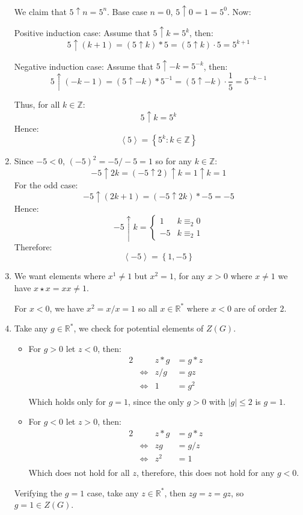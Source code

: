 \documentclass[a4paper, 11pt]{article}
\newcommand{\ZZ}{\mathbb{Z}}
\newcommand{\RR}{\mathbb{R}}
\def\set#1{\left\{ #1 \right\}}
\def\gen#1{\left\langle#1 \right\rangle}
\begin{document}
\begin{enumerate}[label=(\alph*)]
	
	We claim that $5\uparrow n = 5^{n}$. 
	Base case $n=0$, $5\uparrow 0 = 1 = 5^0$. Now: 
	
	Positive induction case: Assume that $5\uparrow k=5^k$, then: 
	\[
		5\uparrow (k+1)=(5\uparrow k)*5 = (5\uparrow k)\cdot 5 = 5^{k+1}	
	\]
	
	Negative induction case: Assume that $5\uparrow -k=5^{-k}$, then: 
	\[
		5\uparrow (-k-1)=(5\uparrow -k)*5^{-1} = (5\uparrow -k)\cdot \frac 15 = 5^{-k-1}	
	\]
	
	Thus, for all $k\in\ZZ$: 
	\[
		5\uparrow k = 5^k 	
	\]
	Hence: 
	\[
		\gen 5 = \set{5^k : k\in\ZZ}	
	\]

	\item 
	Since $-5<0$, $(-5)^2=-5/-5=1$ so for any $k\in\ZZ$:  
	\[
		-5\uparrow 2k = (-5\uparrow2)\uparrow k = 1\uparrow k = 1 
	\]
	For the odd case: 
	\[
		-5\uparrow (2k+1) = (-5\uparrow 2k)*-5 = -5
	\]
	Hence: 
	\[
		-5\uparrow k = \begin{cases}
			 1 & k \equiv_2 0 \\ 
			-5 & k \equiv_2 1
		\end{cases}	
	\]
	Therefore: 
	\[
		\gen{-5}=\set{1,-5}	
	\]
	
	
	\item 
	We want elements where $x^1\neq 1$ but $x^2=1$, for any $x>0$ where $x\neq 1$ we have $x\star x = xx \neq 1$.

	For $x<0$, we have $x^2=x/x=1$ so all $x\in\RR^*$ where $x<0$ are of order $2$. 
	
	\item 
	Take any $g\in\RR^*$, we check for potential elements of $Z(G)$. 

	\begin{itemize}
		\item For $g>0$ let $z<0$, then:
		\begin{alignat*}{2}
			&          & z*g &= g*z   \\
			& \iff     & z/g &= gz    \\ 
			& \iff     & 1   &= g^2  \\ 
		\end{alignat*}
		Which holds only for $g=1$, since the only $g>0$ with $|g|\leq 2$ is $g=1$. 

		\item For $g<0$ let $z>0$, then:
		\begin{alignat*}{2}
			&          & z*g &= g*z \\
			& \iff     & zg  &= g/z \\ 
			& \iff     & z^2 &= 1   \\ 
		\end{alignat*}
		Which does not hold for all $z$, therefore, this does not hold for any $g<0$. 
	\end{itemize}
	Verifying the $g=1$ case, take any $z\in\RR^*$, then $zg = z = gz$, so $g=1\in Z(G)$. 

\end{enumerate}
\end{document}
